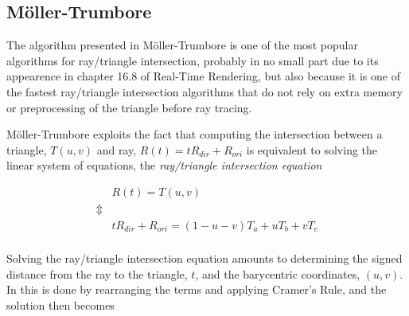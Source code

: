 \subsection{Möller-Trumbore}


The algorithm presented in Möller-Trumbore is one of
the most popular algorithms for ray/triangle intersection, probably in no small
part due to its appearence in chapter 16.8 of Real-Time
Rendering, but also because it is one of the fastest ray/triangle
intersection algorithms that do not rely on extra memory or preprocessing of the
triangle before ray tracing.


Möller-Trumbore exploits the fact that computing the
intersection between a triangle, $T(u, v)$ and ray, $R(t) = tR_{dir} + R_{ori}$ is
equivalent to solving the linear system of equations, the \textit{ray/triangle
  intersection equation}



\begin{displaymath}
  \begin{array}{rl}
    & R(t) = T(u,v) \\
    \Updownarrow \\
    & tR_{dir} + R_{ori} = (1-u-v)T_a + uT_b + vT_c \\
  \end{array}
\end{displaymath}


Solving the ray/triangle intersection equation amounts to determining the signed
distance from the ray to the triangle, $t$, and the barycentric coordinates,
$(u, v)$. In  this is done by rearranging the terms
and applying Cramer's Rule, and the solution then becomes

